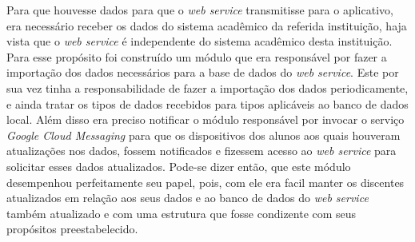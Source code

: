 \par Para que houvesse dados para que o \textit{web service} transmitisse para
o aplicativo, era necessário receber os dados do sistema acadêmico da referida
instituição, haja vista que o \textit{web service} é independente do sistema
acadêmico desta instituição. Para esse propósito foi construído um módulo que
era responsável por fazer a importação dos dados necessários para a base de
dados do \textit{web service}. Este por sua vez tinha a responsabilidade de
fazer a importação dos dados periodicamente, e ainda tratar os tipos de dados
recebidos para tipos aplicáveis ao banco de dados local. Além disso era
preciso notificar o módulo responsável por invocar o serviço \textit{Google
Cloud Messaging} para que os dispositivos dos alunos aos quais houveram
atualizações nos dados, fossem notificados e fizessem acesso ao \textit{web
service} para solicitar esses dados atualizados. Pode-se dizer então, que este
módulo desempenhou perfeitamente seu papel, pois, com ele era facil manter os
discentes atualizados em relação aos seus dados e ao banco de dados do
\textit{web service} também atualizado e com uma estrutura que fosse condizente
com seus propósitos preestabelecido.